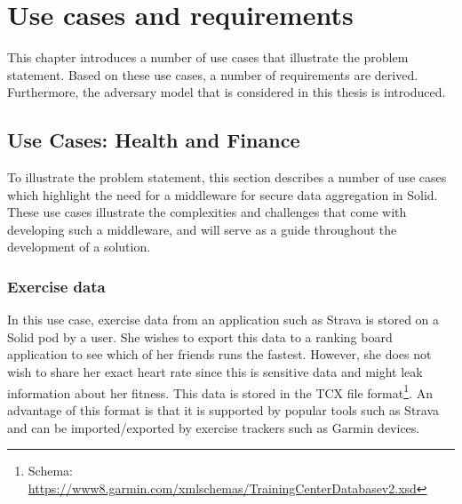 \chapter{Use cases and requirements}
This chapter introduces a number of use cases that illustrate the problem statement. Based on these use cases, a number of requirements are derived. Furthermore, the adversary model that is considered in this thesis is introduced.


\section{Use Cases: Health and Finance}
\label{sec:usecases}
To illustrate the problem statement, this section describes a number of use cases which highlight the need for a middleware for secure data aggregation in Solid. These use cases illustrate the complexities and challenges that come with developing such a middleware, and will serve as a guide throughout the development of a solution.

\subsection{Exercise data}
\label{usecase:ex-data}
In this use case, exercise data from an application such as Strava is stored on a Solid pod by a user. She wishes to export this data to a ranking board application to see which of her friends runs the fastest. However, she does not wish to share her exact heart rate since this is sensitive data and might leak information about her fitness. This data is stored in the TCX file format\footnote{Schema: \url{https://www8.garmin.com/xmlschemas/TrainingCenterDatabasev2.xsd}}. An advantage of this format is that it is supported by popular tools such as Strava and can be imported/exported by exercise trackers such as Garmin devices.

